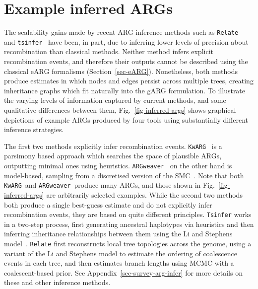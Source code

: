 \documentclass{article}
\newcommand{\tsinfer}[0]{\texttt{tsinfer}}
\newcommand{\kwarg}[0]{\texttt{KwARG}}
\newcommand{\argweaver}[0]{\texttt{ARGweaver}}
\newcommand{\relate}[0]{\texttt{Relate}}
\begin{document}
\section{Example inferred ARGs}
\label{sec-example-inferred-args}
The scalability gains made by recent ARG inference methods
such as \relate~\citep{speidel2019method} and
\tsinfer~\citep{kelleher2019inferring}
have been, in part, due to inferring lower levels of precision about
recombination than classical methods.
Neither method infers
explicit recombination events, and therefore their outputs cannot
be described using the classical eARG formalisms (Section~\ref{sec-eARG}).
Nonetheless, both methods produce estimates in which nodes and edges
persist across multiple trees, creating
inheritance graphs which fit naturally into the gARG formulation.
To illustrate the varying levels of information captured
by current methods, and some qualitative differences between them,
Fig.~\ref{fig-inferred-args} shows graphical depictions of
example ARGs produced by four tools using substantially
different inference strategies.

The first two methods explicitly infer recombination events.
\kwarg~\citep{ignatieva2021kwarg} is a parsimony based approach
which searches the space of plausible ARGs,
outputting minimal ones using heuristics.
\argweaver~\citep{rasmussen2014genome} on the other hand is
model-based, sampling from a discretised version of the
SMC~\citep{mcvean2005approximating,marjoram2006fast}.
Note that both \kwarg\ and \argweaver\ produce many ARGs,
and those shown in Fig.~\ref{fig-inferred-args} are arbitrarily selected
examples.
While the second two methods
both produce a single best-guess estimate and
do not explicitly infer recombination events, they are based on
quite different principles.
\texttt{Tsinfer} works in a two-step process, first generating ancestral
haplotypes via heuristics and then inferring inheritance relationships
between them using the Li and Stephens model~\citep{li2003modeling}.
\texttt{Relate} first reconstructs local tree topologies across the genome,
using a variant of the Li and Stephens model to estimate the
ordering of coalescence events in each tree, and then estimates
branch lengths using MCMC with a coalescent-based prior.
See Appendix~\ref{sec-survey-arg-infer} for more details on these
and other inference methods.
\end{document}
